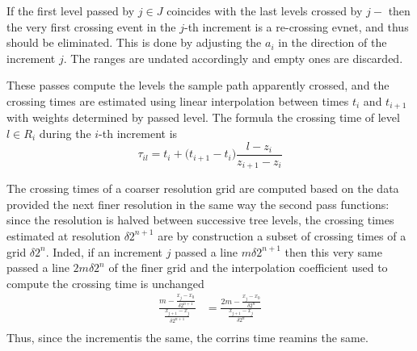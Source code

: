 If the first level passed by $j\in J$ coincides with the last levels crossed by $j-$
then the very first crossing event in the $j$-th increment is a re-crossing evnet,
and thus should be eliminated. This is done by adjusting the $a_i$ in the direction
of the increment $j$. The ranges are undated accordingly and empty ones are discarded.

These passes compute the levels the sample path apparently crossed, and the crossing
times are estimated using linear interpolation between times $t_i$ and $t_{i+1}$ with
weights determined by passed level. The formula the crossing time of level $l\in R_i$
during the $i$-th increment is
\[
\tau_{il} = t_i + \bigl(t_{i+1} - t_i\bigr) \frac{l - z_i}{z_{i+1} - z_i}
\]

The crossing times of a coarser resolution grid are computed based on the 
data provided the next finer resolution in the same way the second pass functions:
since the resolution is halved between successive tree levels, the crossing times
estimated at resolution $\delta 2^{n+1}$ are by construction a subset of crossing
times of a grid $\delta 2^n$. Inded, if an increment $j$ passed a line $m \delta 2^{n+1}$
then this very same passed a line $2m \delta 2^n$ of the finer grid and the interpolation
coefficient used to compute the crossing time is unchanged
\begin{align*}
	\frac{m - \frac{x_j - x_0}{\delta 2^{n+1}}}{ \frac{x_{j+1} - x_j}{\delta 2^{n+1}} }
	&= \frac{2m - \frac{x_j - x_0}{\delta 2^n}}{ \frac{x_{j+1} - x_j}{\delta 2^n} } \\
\end{align*}
Thus, since the incrementis the same, the corrins time reamins the same.


